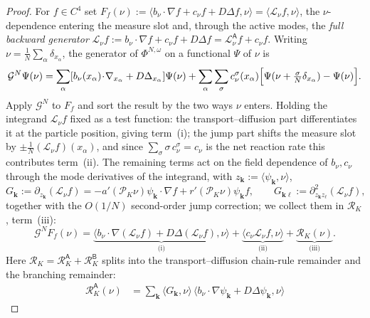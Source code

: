 \documentclass[a4paper,fleqn]{cas-sc}
\theoremstyle{definition}
\theoremstyle{remark}
\begin{document}
\begin{proof}
For $f\in C^4$ set $F_f(\nu):=\langle b_\nu\!\cdot\!\nabla f+c_\nu f+D\Delta f,\nu\rangle
=\langle \mathcal L_\nu f,\nu\rangle$, the $\nu$-dependence entering the measure slot and, through
the active modes, the \emph{full backward generator}
$\mathcal L_\nu f:=b_\nu\!\cdot\!\nabla f+c_\nu f+D\Delta f=\mathcal L^{\mathsf A}_\nu f+c_\nu f$. Writing
$\nu=\frac1N\sum_\alpha\delta_{x_\alpha}$, the generator of $\Phi^{N,\omega}$ on a
functional $\Psi$ of $\nu$ is
\[
\mathcal G^N\Psi(\nu)
=\sum_\alpha[b_\nu(x_\alpha)\!\cdot\!\nabla_{x_\alpha}+D\Delta_{x_\alpha}]\Psi(\nu)
+\sum_{\alpha}\sum_{\sigma}c^\sigma_\nu(x_\alpha)\Bigl[\Psi(\nu+\tfrac{\sigma}N\delta_{x_\alpha})-\Psi(\nu)\Bigr].
\]
Apply $\mathcal G^N$ to $F_f$ and sort the result by the two ways $\nu$ enters. Holding the
integrand $\mathcal L_\nu f$ fixed as a test function: the transport--diffusion part differentiates
it at the particle position, giving term~(i); the jump part shifts the measure slot by
$\pm\tfrac1N(\mathcal L_\nu f)(x_\alpha)$, and since $\sum_\sigma\sigma\,c^\sigma_\nu=c_\nu$ is the
net reaction rate this contributes term~(ii). The remaining terms act on the field dependence of
$b_\nu,c_\nu$ through the mode derivatives of the integrand, with $z_{\mathbf k}:=\langle\psi_{\mathbf k},\nu\rangle$,
\begin{equation}
G_{\mathbf k}:=\partial_{z_{\mathbf k}}(\mathcal L_\nu f)
=-a'(\mathcal P_K\nu)\psi_{\mathbf k}\!\cdot\!\nabla f+r'(\mathcal P_K\nu)\psi_{\mathbf k}f,
\qquad
G_{\mathbf k\ell}:=\partial^2_{z_{\mathbf k}z_\ell}(\mathcal L_\nu f),
\end{equation}
together with the $O(1/N)$ second-order jump correction; we collect them in $\mathcal R_K$, term~(iii):
\begin{equation}\label{eq:GNFf-decomp}
\mathcal G^N F_f(\nu)
=\underbrace{\langle b_\nu\!\cdot\!\nabla(\mathcal L_\nu f)+D\Delta(\mathcal L_\nu f),\nu\rangle}_{\text{(i)}}
+\underbrace{\langle c_\nu \mathcal L_\nu f,\nu\rangle}_{\text{(ii)}}
+\underbrace{\mathcal R_K(\nu)}_{\text{(iii)}}.
\end{equation}
Here $\mathcal R_K=\mathcal R_K^{\mathsf A}+\mathcal R_K^{\mathsf B}$ splits into the transport--diffusion
chain-rule remainder and the branching remainder:
\begin{equation}\label{eq:RKA}
\begin{aligned}
\mathcal R_K^{\mathsf A}(\nu)
&=\sum_{\mathbf k}\langle G_{\mathbf k},\nu\rangle\,
   \langle b_\nu\!\cdot\!\nabla\psi_{\mathbf k}+D\Delta\psi_{\mathbf k},\nu\rangle

\end{aligned}
\end{equation}
\end{proof}
\end{document}
